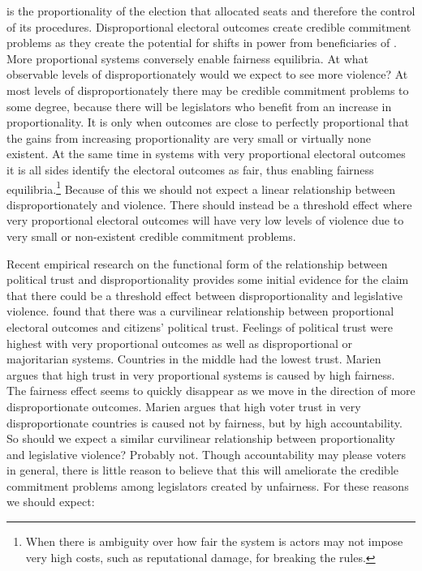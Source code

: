 \documentclass[a4paper]{article}\usepackage[]{graphicx}\usepackage[]{color}
\begin{document}
 is the proportionality of the election that allocated  seats and therefore the control of its procedures. Disproportional electoral outcomes create credible commitment problems as they create the potential for shifts in power from beneficiaries of . More proportional  systems conversely enable fairness equilibria. At what observable levels of  disproportionately would we expect to see more violence? At most levels of disproportionately there may be credible commitment problems to some degree, because there will be legislators who benefit from an increase in proportionality. It is only when outcomes are close to perfectly proportional that the gains from increasing proportionality are very small or virtually none existent. At the same time in systems with very proportional electoral outcomes it is  all sides identify the electoral outcomes as fair, thus enabling fairness equilibria.\footnote{When there is ambiguity over how fair the system is actors may not impose very high costs, such as reputational damage, for breaking the rules.} Because of this we should not expect a linear relationship between disproportionately and violence. There should instead be a threshold effect where very proportional electoral outcomes will have very low levels of violence due to very small or non-existent credible commitment problems.

Recent empirical research on the functional form of the relationship between political trust and disproportionality provides some initial evidence for the claim that there could be a threshold effect between disproportionality and legislative violence. \cite{Marien2011} found that there was a curvilinear relationship between proportional electoral outcomes and citizens' political trust. Feelings of political trust were highest with very proportional outcomes as well as disproportional or majoritarian systems. Countries in the middle had the lowest trust. Marien argues that high trust in very proportional systems is caused by high fairness. The fairness effect seems to quickly disappear as we move in the direction of more disproportionate outcomes. Marien argues that high voter trust in very disproportionate countries is caused not by fairness, but by high accountability. So should we expect a similar curvilinear relationship between proportionality and legislative violence? Probably not. Though accountability may please voters in general, there is little reason to believe that this will ameliorate the credible commitment problems among legislators created by unfairness. For these reasons we should expect:
\end{document}
